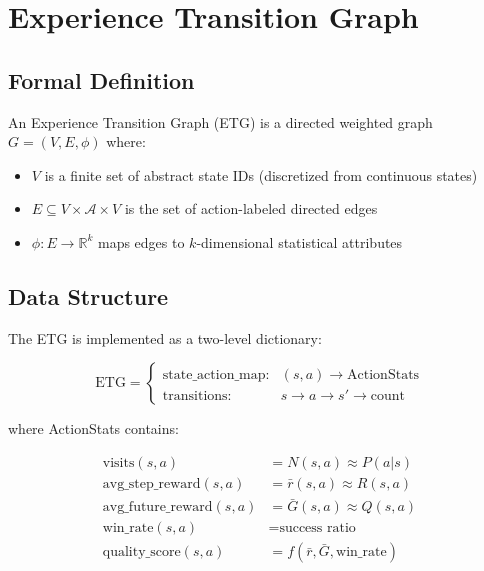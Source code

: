\documentclass[letterpaper]{article}
\begin{document}
\section{Experience Transition Graph}

\subsection{Formal Definition}

An Experience Transition Graph (ETG) is a directed weighted graph $G = (V, E, \phi)$ where:

\begin{itemize}
    \item $V$ is a finite set of abstract state IDs (discretized from continuous states)
    \item $E \subseteq V \times \mathcal{A} \times V$ is the set of action-labeled directed edges
    \item $\phi: E \rightarrow \mathbb{R}^k$ maps edges to $k$-dimensional statistical attributes
\end{itemize}

\subsection{Data Structure}

The ETG is implemented as a two-level dictionary:

\begin{equation}
\text{ETG} = \begin{cases}
\text{state\_action\_map}: & (s, a) \rightarrow \text{ActionStats} \\
\text{transitions}: & s \rightarrow a \rightarrow s' \rightarrow \text{count}
\end{cases}
\end{equation}

where ActionStats contains:

\begin{align}
\text{visits}(s,a) &= N(s,a) \approx P(a|s) \\
\text{avg\_step\_reward}(s,a) &= \bar{r}(s,a) \approx R(s,a) \\
\text{avg\_future\_reward}(s,a) &= \bar{G}(s,a) \approx Q(s,a) \\
\text{win\_rate}(s,a) &= \text{success ratio} \\
\text{quality\_score}(s,a) &= f(\bar{r}, \bar{G}, \text{win\_rate})
\end{align}
\end{document}
